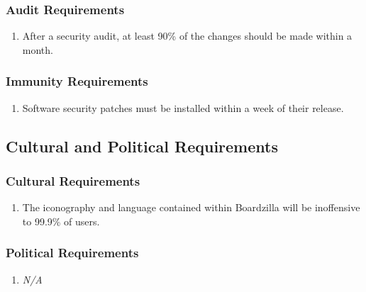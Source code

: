 \documentclass{article}
\begin{document}
\subsubsection{Audit Requirements}
\label{ssub:audit_requirements}
\begin{enumerate}[{SR}1. ]
	\item After a security audit, at least 90\% of the changes should be made within a month.
\end{enumerate}

\subsubsection{Immunity Requirements}
\label{ssub:immunity_requirements}
\begin{enumerate}[{SR}1. ]
	\item Software security patches must be installed within a week of their release.
\end{enumerate}


\subsection{Cultural and Political Requirements}
\label{sub:cultural_and_political_requirements}

\subsubsection{Cultural Requirements}
\label{ssub:cultural_requirements}
\begin{enumerate}[{CP}1. ]
	\item The iconography and language contained within Boardzilla will be inoffensive to 99.9\% of users.
\end{enumerate}

\subsubsection{Political Requirements}
\label{ssub:political_requirements}
\begin{enumerate}[{CP}1. ]
	\item \emph{N/A}
\end{enumerate}

\end{document}
